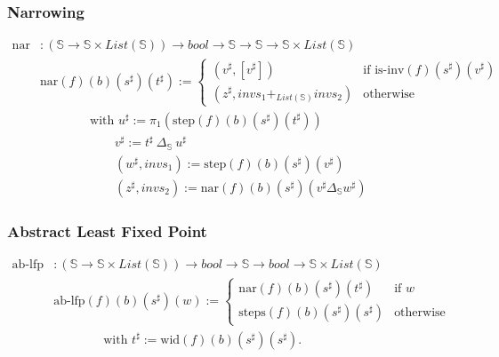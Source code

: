 \documentclass{beamer}
\begin{document}
        \begin{frame}
            \frametitle{Narrowing}
            \begin{align*}
                \text{nar} &: (\mathbb{S} \to \mathbb{S} \times List(\mathbb{S})) \to bool \to \mathbb{S} \to \mathbb{S} \to \mathbb{S} \times List(\mathbb{S}) \\
                &\text{nar} (f) (b) (s^{\sharp}) (t^{\sharp}) := \begin{cases}
                                                                (v^{\sharp}, [v^{\sharp}]) & \text{if } \text{is-inv} (f) (s^{\sharp}) (v^{\sharp}) \\
                                                                (z^{\sharp}, invs_1 +_{List(\mathbb{S})} invs_2) & \text{otherwise}
                                                                \end{cases} \\
                & \qquad \qquad \text{with } u^{\sharp} := \pi_1 (\text{step} (f) (b) (s^{\sharp}) (t^{\sharp})) \\ 
                & \qquad \qquad \qquad v^{\sharp} := t^{\sharp}\ \Delta_\mathbb{S}\ u^{\sharp} \\
                & \qquad \qquad \qquad (w^{\sharp}, invs_1) := \text{step} (f) (b) (s^{\sharp}) (v^{\sharp}) \\
                & \qquad \qquad \qquad (z^{\sharp}, invs_2) := \text{nar} (f) (b) (s^{\sharp}) (v^{\sharp} \Delta_\mathbb{S} w^{\sharp})
            \end{align*}
        
        \end{frame}

        \begin{frame}
            \frametitle{Abstract Least Fixed Point}
            \begin{align*}
                \text{ab-lfp} &: (\mathbb{S} \to \mathbb{S} \times List(\mathbb{S})) \to bool \to \mathbb{S} \to bool \to \mathbb{S} \times List(\mathbb{S}) \\
                &\text{ab-lfp} (f) (b) (s^{\sharp}) (w) := \begin{cases}
                                                        \text{nar} (f) (b) (s^{\sharp}) (t^{\sharp})  & \text{if } w \\
                                                        \text{steps} (f) (b) (s^{\sharp}) (s^{\sharp}) & \text{otherwise}
                                                        \end{cases} \\
                & \qquad \qquad \text{with } t^{\sharp} := \text{wid} (f) (b) (s^{\sharp}) (s^{\sharp}).
            \end{align*}
            
        \end{frame}
        
\end{document}

